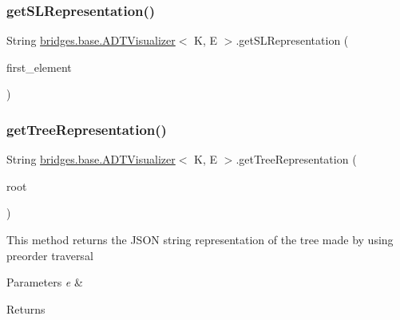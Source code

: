 \subsubsection{\texorpdfstring{get\+S\+L\+Representation()}{getSLRepresentation()}}
{\footnotesize\ttfamily String \hyperlink{classbridges_1_1base_1_1_a_d_t_visualizer}{bridges.\+base.\+A\+D\+T\+Visualizer}$<$ K, E $>$.get\+S\+L\+Representation (\begin{DoxyParamCaption}\item[{\hyperlink{classbridges_1_1base_1_1_s_lelement}{S\+Lelement}$<$ E $>$}]{first\+\_\+element }\end{DoxyParamCaption})}

\hypertarget{classbridges_1_1base_1_1_a_d_t_visualizer_ae01d3d38d5c7c3ac239e86d6be46a50a}{}\label{classbridges_1_1base_1_1_a_d_t_visualizer_ae01d3d38d5c7c3ac239e86d6be46a50a} 
\subsubsection{\texorpdfstring{get\+Tree\+Representation()}{getTreeRepresentation()}}
{\footnotesize\ttfamily String \hyperlink{classbridges_1_1base_1_1_a_d_t_visualizer}{bridges.\+base.\+A\+D\+T\+Visualizer}$<$ K, E $>$.get\+Tree\+Representation (\begin{DoxyParamCaption}\item[{\hyperlink{classbridges_1_1base_1_1_tree_element}{Tree\+Element}$<$ E $>$}]{root }\end{DoxyParamCaption})}

This method returns the J\+S\+ON string representation of the tree made by using preorder traversal 
\begin{DoxyParams}{Parameters}
{\em e} & \\
\hline
\end{DoxyParams}
\begin{DoxyReturn}{Returns}

\end{DoxyReturn}
\hypertarget{classbridges_1_1base_1_1_a_d_t_visualizer_aea37161ff4b74fbeae6f478b4c2e1a50}{}\label{classbridges_1_1base_1_1_a_d_t_visualizer_aea37161ff4b74fbeae6f478b4c2e1a50} 
